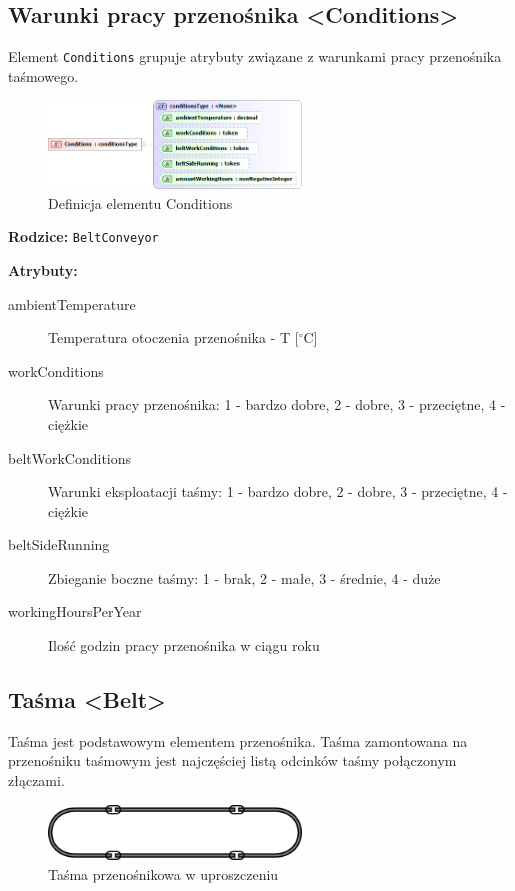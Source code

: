 \documentclass[12pt,a4paper]{article}
\begin{document}
\subsection{Warunki pracy przenośnika <Conditions>}
Element {\tt Conditions} grupuje atrybuty związane z warunkami pracy przenośnika
taśmowego.

\begin{figure}[H]
  \centering
  \includegraphics[width=0.6\textwidth]{png/conditions_xsd2}
  \caption{Definicja elementu Conditions}
  \label{fig:conditions-xsd}
\end{figure}

\noindent\textbf{Rodzice:} \texttt{BeltConveyor}

\noindent\textbf{Atrybuty:}
\begin{description}
\item[ambientTemperature] Temperatura otoczenia przenośnika - T [$^\circ$C]
\item[workConditions] Warunki pracy przenośnika: 1 - bardzo dobre, 2 - dobre,
  3 - przeciętne, 4 - ciężkie
\item[beltWorkConditions] Warunki eksploatacji taśmy: 1 - bardzo dobre,
  2 - dobre, 3 - przeciętne, 4 - ciężkie
\item[beltSideRunning] Zbieganie boczne taśmy: 1 - brak, 2 - małe, 3 - średnie,
  4 - duże
\item[workingHoursPerYear] Ilość godzin pracy przenośnika w ciągu roku
\end{description}


\subsection{Taśma <Belt>}\label{sec:Belt}
Taśma jest podstawowym elementem przenośnika. Taśma zamontowana na przenośniku
taśmowym jest najczęściej listą odcinków taśmy połączonym złączami.

\begin{figure}[H]
  \centering
  \includegraphics[width=0.6\textwidth]{png/tasma}
  \caption{Taśma przenośnikowa w uproszczeniu}
  \label{fig:belt-drw}
\end{figure}
\end{document}
